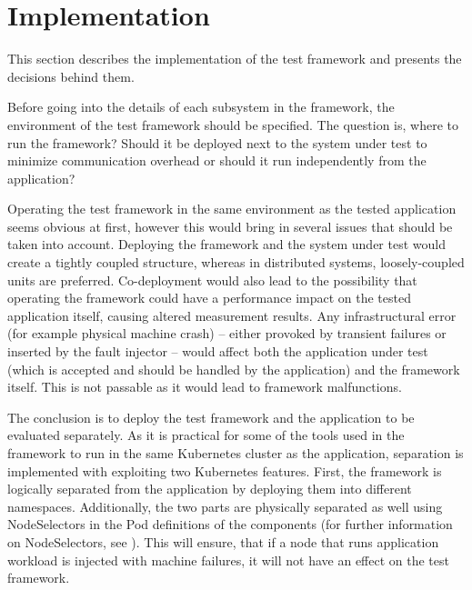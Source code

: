 \section{Implementation} \label{test-framework-impl}


This section describes the implementation of the test framework and presents the decisions behind them.

Before going into the details of each subsystem in the framework, the environment of the test framework should be specified. The question is, where to run the framework? Should it be deployed next to the system under test to minimize communication overhead or should it run independently from the application?

Operating the test framework in the same environment as the tested application seems obvious at first, however this would bring in several issues that should be taken into account. Deploying the framework and the system under test would create a tightly coupled structure, whereas in distributed systems, loosely-coupled units are preferred. Co-deployment would also lead to the possibility that operating the framework could have a performance impact on the tested application itself, causing altered measurement results. Any infrastructural error (for example physical machine crash) -- either provoked by transient failures or inserted by the fault injector -- would affect both the application under test (which is accepted and should be handled by the application) and the framework itself. This is not passable as it would lead to framework malfunctions.

The conclusion is to deploy the test framework and the application to be evaluated separately. As it is practical for some of the tools used in the framework to run in the same Kubernetes cluster as the application, separation is implemented with exploiting two Kubernetes features. First, the framework is logically separated from the application by deploying them into different namespaces. Additionally, the two parts are physically separated as well using NodeSelectors in the Pod definitions of the components (for further information on NodeSelectors, see \cite{KubernetesNodeSelector}). This will ensure, that if a node that runs application workload is injected with machine failures, it will not have an effect on the test framework.

